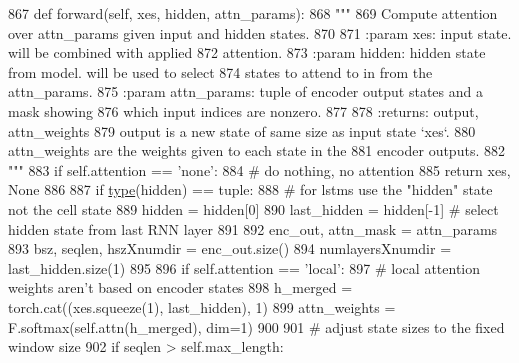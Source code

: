 \begin{DoxyCode}
867     \textcolor{keyword}{def }forward(self, xes, hidden, attn\_params):
868         \textcolor{stringliteral}{"""}
869 \textcolor{stringliteral}{        Compute attention over attn\_params given input and hidden states.}
870 \textcolor{stringliteral}{}
871 \textcolor{stringliteral}{        :param xes:         input state. will be combined with applied}
872 \textcolor{stringliteral}{                            attention.}
873 \textcolor{stringliteral}{        :param hidden:      hidden state from model. will be used to select}
874 \textcolor{stringliteral}{                            states to attend to in from the attn\_params.}
875 \textcolor{stringliteral}{        :param attn\_params: tuple of encoder output states and a mask showing}
876 \textcolor{stringliteral}{                            which input indices are nonzero.}
877 \textcolor{stringliteral}{}
878 \textcolor{stringliteral}{        :returns: output, attn\_weights}
879 \textcolor{stringliteral}{                  output is a new state of same size as input state `xes`.}
880 \textcolor{stringliteral}{                  attn\_weights are the weights given to each state in the}
881 \textcolor{stringliteral}{                  encoder outputs.}
882 \textcolor{stringliteral}{        """}
883         \textcolor{keywordflow}{if} self.attention == \textcolor{stringliteral}{'none'}:
884             \textcolor{comment}{# do nothing, no attention}
885             \textcolor{keywordflow}{return} xes, \textcolor{keywordtype}{None}
886 
887         \textcolor{keywordflow}{if} \hyperlink{namespaceparlai_1_1agents_1_1tfidf__retriever_1_1build__tfidf_ad5dfae268e23f506da084a9efb72f619}{type}(hidden) == tuple:
888             \textcolor{comment}{# for lstms use the "hidden" state not the cell state}
889             hidden = hidden[0]
890         last\_hidden = hidden[-1]  \textcolor{comment}{# select hidden state from last RNN layer}
891 
892         enc\_out, attn\_mask = attn\_params
893         bsz, seqlen, hszXnumdir = enc\_out.size()
894         numlayersXnumdir = last\_hidden.size(1)
895 
896         \textcolor{keywordflow}{if} self.attention == \textcolor{stringliteral}{'local'}:
897             \textcolor{comment}{# local attention weights aren't based on encoder states}
898             h\_merged = torch.cat((xes.squeeze(1), last\_hidden), 1)
899             attn\_weights = F.softmax(self.attn(h\_merged), dim=1)
900 
901             \textcolor{comment}{# adjust state sizes to the fixed window size}
902             \textcolor{keywordflow}{if} seqlen > self.max\_length:

\end{DoxyCode}
